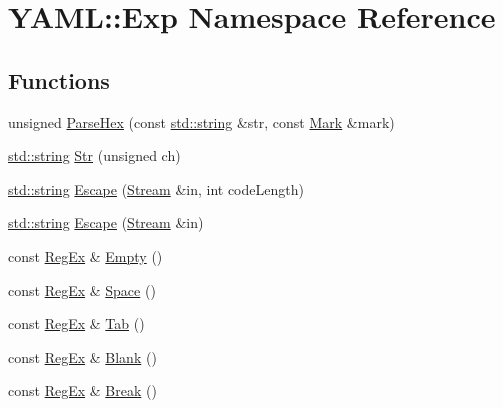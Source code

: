 \hypertarget{namespace_y_a_m_l_1_1_exp}{}\section{Y\+A\+ML\+::Exp Namespace Reference}
\label{namespace_y_a_m_l_1_1_exp}
\subsection*{Functions}
\begin{DoxyCompactItemize}
\item 
unsigned \mbox{\hyperlink{namespace_y_a_m_l_1_1_exp_a30bb3334bfe4ffc2020d70a452e14696}{Parse\+Hex}} (const \mbox{\hyperlink{glad_8h_ac83513893df92266f79a515488701770}{std\+::string}} \&str, const \mbox{\hyperlink{struct_y_a_m_l_1_1_mark}{Mark}} \&mark)
\item 
\mbox{\hyperlink{glad_8h_ac83513893df92266f79a515488701770}{std\+::string}} \mbox{\hyperlink{namespace_y_a_m_l_1_1_exp_a2d8533a2c3699d22f183501748704597}{Str}} (unsigned ch)
\item 
\mbox{\hyperlink{glad_8h_ac83513893df92266f79a515488701770}{std\+::string}} \mbox{\hyperlink{namespace_y_a_m_l_1_1_exp_aa0420fb20a465d5981e56a271e16b58e}{Escape}} (\mbox{\hyperlink{class_y_a_m_l_1_1_stream}{Stream}} \&in, int code\+Length)
\item 
\mbox{\hyperlink{glad_8h_ac83513893df92266f79a515488701770}{std\+::string}} \mbox{\hyperlink{namespace_y_a_m_l_1_1_exp_a8bf36f44c2818347e3866895fc77ff60}{Escape}} (\mbox{\hyperlink{class_y_a_m_l_1_1_stream}{Stream}} \&in)
\item 
const \mbox{\hyperlink{class_y_a_m_l_1_1_reg_ex}{Reg\+Ex}} \& \mbox{\hyperlink{namespace_y_a_m_l_1_1_exp_ad8890f8583c74e2547858e2f57c62464}{Empty}} ()
\item 
const \mbox{\hyperlink{class_y_a_m_l_1_1_reg_ex}{Reg\+Ex}} \& \mbox{\hyperlink{namespace_y_a_m_l_1_1_exp_a81c8e7987a6fd19d3a5fc370ab05bbfc}{Space}} ()
\item 
const \mbox{\hyperlink{class_y_a_m_l_1_1_reg_ex}{Reg\+Ex}} \& \mbox{\hyperlink{namespace_y_a_m_l_1_1_exp_ad887cc88621989229430c76bfa2a2ef7}{Tab}} ()
\item 
const \mbox{\hyperlink{class_y_a_m_l_1_1_reg_ex}{Reg\+Ex}} \& \mbox{\hyperlink{namespace_y_a_m_l_1_1_exp_a9e46fa32369008b9058481ed04928ac9}{Blank}} ()
\item 
const \mbox{\hyperlink{class_y_a_m_l_1_1_reg_ex}{Reg\+Ex}} \& \mbox{\hyperlink{namespace_y_a_m_l_1_1_exp_ae9be2384dfda70daa8f5e9e9f6509383}{Break}} ()

\end{DoxyCompactItemize}
